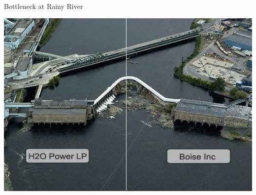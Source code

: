 \documentclass[compress,english]{beamer}
\begin{document}
\begin{frame}{Bottleneck at Rainy River}

\begin{center}
\includegraphics[height=0.7\paperheight]{fort-frances-split.jpg}
\end{center}

\end{frame}

\end{document}
